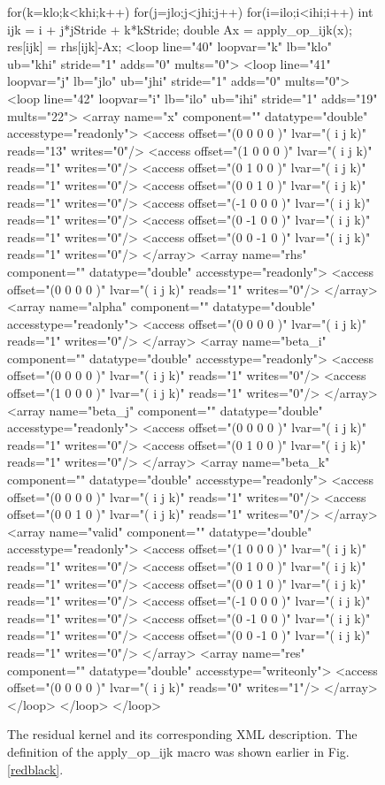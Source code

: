\documentclass{article}
\begin{document}
\begin{figure}[htp]
\begin{boxedverbatim}
for(k=klo;k<khi;k++){
  for(j=jlo;j<jhi;j++){
    for(i=ilo;i<ihi;i++){
      int ijk = i + j*jStride + k*kStride;
      double Ax = apply_op_ijk(x);
      res[ijk] = rhs[ijk]-Ax;
}}}
<loop line="40" loopvar="k" lb="klo" ub="khi" stride="1" adds="0" mults="0">
<loop line="41" loopvar="j" lb="jlo" ub="jhi" stride="1" adds="0" mults="0">
<loop line="42" loopvar="i" lb="ilo" ub="ihi" stride="1" adds="19" mults="22">
<array name="x" component="" datatype="double" accesstype="readonly">
<access offset="(0 0 0 0 )" lvar="(  i j k)" reads="13" writes="0"/>
<access offset="(1 0 0 0 )" lvar="(  i j k)" reads="1" writes="0"/>
<access offset="(0 1 0 0 )" lvar="(  i j k)" reads="1" writes="0"/>
<access offset="(0 0 1 0 )" lvar="(  i j k)" reads="1" writes="0"/>
<access offset="(-1 0 0 0 )" lvar="(  i j k)" reads="1" writes="0"/>
<access offset="(0 -1 0 0 )" lvar="(  i j k)" reads="1" writes="0"/>
<access offset="(0 0 -1 0 )" lvar="(  i j k)" reads="1" writes="0"/>
</array>
<array name="rhs" component="" datatype="double" accesstype="readonly">
<access offset="(0 0 0 0 )" lvar="(  i j k)" reads="1" writes="0"/>
</array>
<array name="alpha" component="" datatype="double" accesstype="readonly">
<access offset="(0 0 0 0 )" lvar="(  i j k)" reads="1" writes="0"/>
</array>
<array name="beta_i" component="" datatype="double" accesstype="readonly">
<access offset="(0 0 0 0 )" lvar="(  i j k)" reads="1" writes="0"/>
<access offset="(1 0 0 0 )" lvar="(  i j k)" reads="1" writes="0"/>
</array>
<array name="beta_j" component="" datatype="double" accesstype="readonly">
<access offset="(0 0 0 0 )" lvar="(  i j k)" reads="1" writes="0"/>
<access offset="(0 1 0 0 )" lvar="(  i j k)" reads="1" writes="0"/>
</array>
<array name="beta_k" component="" datatype="double" accesstype="readonly">
<access offset="(0 0 0 0 )" lvar="(  i j k)" reads="1" writes="0"/>
<access offset="(0 0 1 0 )" lvar="(  i j k)" reads="1" writes="0"/>
</array>
<array name="valid" component="" datatype="double" accesstype="readonly">
<access offset="(1 0 0 0 )" lvar="(  i j k)" reads="1" writes="0"/>
<access offset="(0 1 0 0 )" lvar="(  i j k)" reads="1" writes="0"/>
<access offset="(0 0 1 0 )" lvar="(  i j k)" reads="1" writes="0"/>
<access offset="(-1 0 0 0 )" lvar="(  i j k)" reads="1" writes="0"/>
<access offset="(0 -1 0 0 )" lvar="(  i j k)" reads="1" writes="0"/>
<access offset="(0 0 -1 0 )" lvar="(  i j k)" reads="1" writes="0"/>
</array>
<array name="res" component="" datatype="double" accesstype="writeonly">
<access offset="(0 0 0 0 )" lvar="(  i j k)" reads="0" writes="1"/>
</array>
</loop>
</loop>
</loop>
\end{boxedverbatim}
\caption{The residual kernel and its corresponding XML description. The definition of the apply\_op\_ijk macro was shown earlier in Fig.\ref{redblack}.}
\label{residual}
\end{figure}
\end{document}
